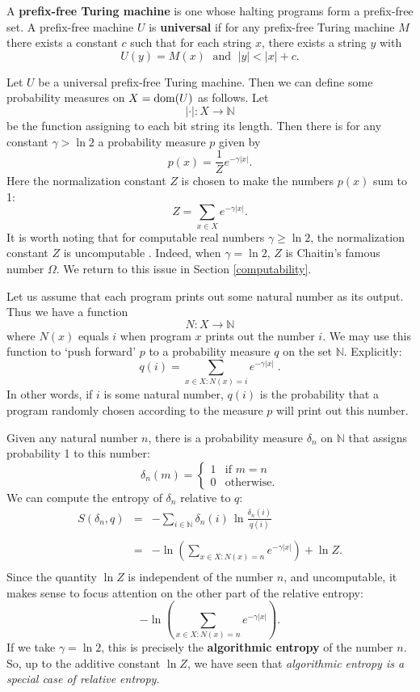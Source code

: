 \documentclass{article}
\newcommand{\N}{{\mathbb N}}
\newcommand{\dom}{{\rm dom}}
\renewcommand{\to}{\rightarrow}
\newcommand{\maps}{\colon}
\begin{document}
A \textbf{prefix-free Turing machine} is one whose halting programs
form a prefix-free set.  A prefix-free machine $U$ is {\bf universal}
if for any prefix-free Turing machine $M$ there exists a constant
$c$ such that for each string $x$, there exists a string $y$ with
\[ U(y) = M(x) \; \mbox{ and } \; |y| < |x| + c. \]

Let $U$ be a universal prefix-free Turing machine.  Then 
we can define some probability measures on $X = \dom(U)$
as follows.   Let 
\[  |\cdot | \maps X \to \N \]
be the function assigning to each bit string its length.  
Then there is for any constant $\gamma > \ln 2$ a probability measure 
$p$ given by
\[   p(x) = \frac{1}{Z} e^{-\gamma |x|}. \]
Here the normalization constant $Z$ is chosen to make the numbers
$p(x)$ sum to 1:
\[   Z = \sum_{x \in X} e^{-\gamma |x|}  .\]
It is worth noting that for computable real numbers $\gamma \ge \ln 2$, 
the normalization constant $Z$ is uncomputable \cite{Tadaki2002}.
Indeed, when $\gamma = \ln 2$, $Z$ is Chaitin's famous number $\Omega$.
We return to this issue in Section \ref{computability}.

Let us assume that each program prints out some natural
number as its output.   Thus we have a function
\[ N \maps X \to \N \]
where $N(x)$ equals $i$ when program $x$ prints out the number $i$.
We may use this function to `push forward' $p$ to a probability measure
$q$ on the set $\N$.  Explicitly:
\[ 
   q(i) = \displaystyle {\sum_{x \in X : N(x) = i}} e^{-\gamma |x|} \; .
\]
In other words, if $i$ is some natural number, $q(i)$ is the 
probability that a program randomly chosen according to the measure
$p$ will print out this number.  

Given any natural number $n$, there is a probability measure
$\delta_n$ on $\N$ that assigns probability 1 to this number:
\[   \delta_n(m) = \left\{ \begin{array}{cl} 1 & \textrm{if } m = n \\
                              0 & \textrm{otherwise.}  
           \end{array} \right.
\]
We can compute the entropy of $\delta_n$ relative to $q$:
\begin{equation}
\label{relative.entropy}
\begin{array}{ccl} S(\delta_n,q) &=& 
\displaystyle{ -\sum_{i \in \N}  \delta_n(i) \, 
\ln \frac{\delta_n(i)}{q(i)}}   \\
\\ &=& \displaystyle{ -\ln \left( \sum_{x \in X \colon N(x) = n} 
e^{-\gamma |x|} \right) + \ln Z .}  \\
\end{array}
\end{equation}
Since the quantity $\ln Z$ is independent of the number $n$, and
uncomputable, it makes sense to focus attention on the other part
of the relative entropy:
\[  \displaystyle{ -\ln \left( \sum_{x \in X \colon N(x) = n} 
e^{-\gamma |x|} \right) .}  
\]
If we take $\gamma = \ln 2$, this is precisely the \textbf{algorithmic
entropy} \cite{Chaitin1976,LevinZvonkin} of the number $n$.  So, up to the
additive constant $\ln Z$, we have seen that \textit{algorithmic entropy 
is a special case of relative entropy}.  
\end{document}
